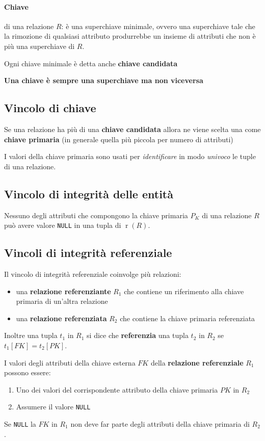         \paragraph{Chiave} di una relazione $ R $: è una superchiave minimale, ovvero una superchiave tale che la rimozione di qualsiasi attributo produrrebbe un insieme di attributi che non è più una superchiave di $ R $.
        
            Ogni chiave minimale è detta anche \textbf{chiave candidata}
    
        \textbf{Una chiave è sempre una superchiave ma non viceversa}
    \subsection{Vincolo di chiave}
        Se una relazione ha più di una \textbf{chiave candidata} allora ne viene scelta una come \textbf{chiave primaria} (in generale quella più piccola per numero di attributi)

        I valori della chiave primaria sono usati per \textit{identificare} in modo \textit{univoco} le tuple di una relazione.

    \subsection{Vincolo di integrità delle entità}
        Nessuno degli attributi che compongono la chiave primaria $ P_K $ di una relazione $ R $ può avere valore \texttt{NULL} in una tupla di $ \operatorname{r}(R) $.
    \subsection{Vincoli di integrità referenziale}
        Il vincolo di integrità referenziale coinvolge più relazioni:
        \begin{itemize}
            \item una \textbf{relazione referenziante} $ R_1 $ che contiene un riferimento alla chiave primaria di un'altra relazione
            \item una \textbf{relazione referenziata} $ R_2 $ che contiene la chiave primaria referenziata
        \end{itemize}
        Inoltre una tupla $ t_1 $ in $ R_1 $ si dice che \textbf{referenzia} una tupla $ t_2 $ in $ R_2 $ se $t_1[FK] = t_2[PK] $.
        
        I valori degli attributi della chiave esterna $ FK $ della \textbf{relazione referenziale} $ R_1 $ possono essere:
            \begin{enumerate}
                \item Uno dei valori del corrispondente attributo della chiave primaria $ PK $ in $ R_2 $
                \item Assumere il valore \texttt{NULL}
            \end{enumerate}
        Se \texttt{NULL} la $ FK $ in $ R_1 $ non deve far parte degli attributi della chiave primaria di $ R_2 $.

